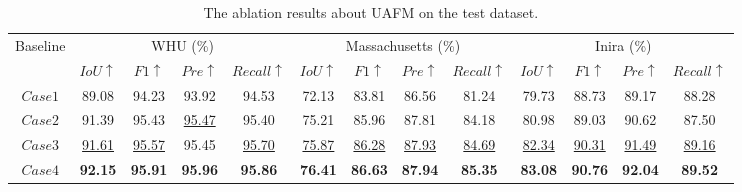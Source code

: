 \documentclass[lettersize,journal]{IEEEtran}
\begin{document}
\begin{table*}[]
\normalsize
\setlength\tabcolsep{3pt}
\caption{The ablation results about UAFM on the test dataset.}
\label{tab:table_UAFM}
\center
\begin{tabular}{c|cccc|cccc|cccc}
\hline
\multirow{2}{*}{Baseline} & \multicolumn{4}{c|}{WHU (\%)}&\multicolumn{4}{c|}{Massachusetts (\%)} &\multicolumn{4}{c}{Inira (\%)}                                             
 \\ \cline{2-13} 
 & $IoU\uparrow$ & $F1\uparrow$ & $Pre\uparrow$ & $Recall\uparrow$ 
 & $IoU\uparrow$ & $F1\uparrow$ & $Pre\uparrow$ & $Recall\uparrow$
 & $IoU\uparrow$ & $F1\uparrow$ & $Pre\uparrow$ & $Recall\uparrow$ \\ \hline
$Case 1$&
89.08	&94.23	&93.92	&94.53	
&72.13	&83.81	&86.56	&81.24 
&79.73  &88.73  &89.17  &88.28\\
$Case 2$&
91.39 &95.43 &\underline{95.47} &95.40
&75.21 &85.96 &{87.81} &84.18 
&80.98 &89.03 &90.62 &87.50\\ 
$Case 3$ &
\underline{91.61} &\underline{95.57} &95.45 &\underline{95.70}
&\underline{75.87} &\underline{86.28} &\underline{87.93} &\underline{84.69}
&\underline{82.34} &\underline{90.31} &\underline{91.49} &\underline{89.16}\\  
$Case 4$ &
\color{red}\textbf{92.15} &{\color{red}\textbf{95.91}} &{\color{red}\textbf{95.96}} &\color{red}\textbf{95.86}

& \color{red}\textbf{{76.41}} &\color{red}\textbf{{86.63}} &\color{red}\textbf{87.94} &\color{red}\textbf{{85.35}}

& {\color{red}\textbf{83.08}} &{\color{red}\textbf{90.76}} &{\color{red}\textbf{92.04}} &{\color{red}\textbf{89.52}}
\\ \hline
\end{tabular}
\end{table*}
\end{document}
